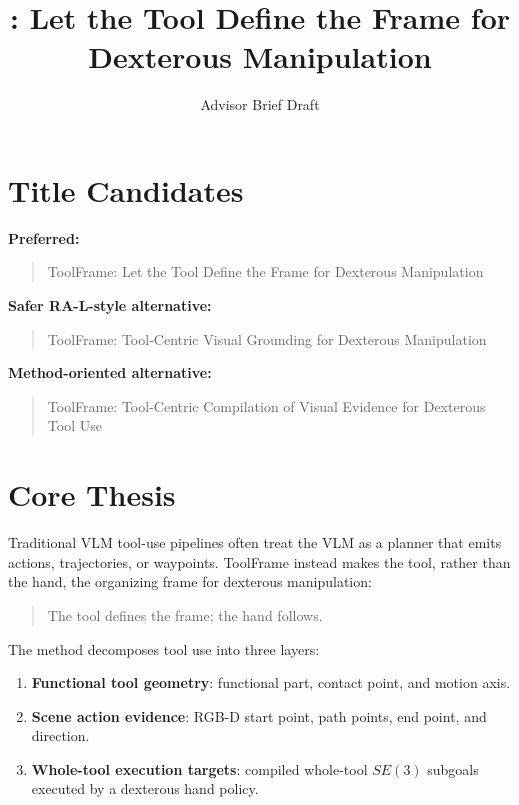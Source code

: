 \documentclass[journal]{IEEEtran}
\title{\method{}: Let the Tool Define the Frame for Dexterous Manipulation}
\author{Advisor Brief Draft}
\newcommand{\method}{ToolFrame}
\begin{document}
\maketitle

\section*{Title Candidates}
\textbf{Preferred:}
\begin{quote}
\method{}: Let the Tool Define the Frame for Dexterous Manipulation
\end{quote}

\textbf{Safer RA-L-style alternative:}
\begin{quote}
\method{}: Tool-Centric Visual Grounding for Dexterous Manipulation
\end{quote}

\textbf{Method-oriented alternative:}
\begin{quote}
\method{}: Tool-Centric Compilation of Visual Evidence for Dexterous Tool Use
\end{quote}

\section{Core Thesis}
Traditional VLM tool-use pipelines often treat the VLM as a planner that emits
actions, trajectories, or waypoints. \method{} instead makes the tool, rather
than the hand, the organizing frame for dexterous manipulation:
\begin{quote}
The tool defines the frame; the hand follows.
\end{quote}

The method decomposes tool use into three layers:
\begin{enumerate}
  \item \textbf{Functional tool geometry}: functional part, contact point, and
  motion axis.
  \item \textbf{Scene action evidence}: RGB-D start point, path points, end
  point, and direction.
  \item \textbf{Whole-tool execution targets}: compiled whole-tool $SE(3)$
  subgoals executed by a dexterous hand policy.
\end{enumerate}
\end{document}
